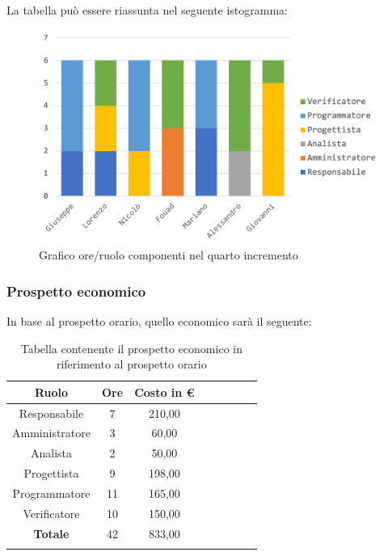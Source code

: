 		La tabella può essere riassunta nel seguente istogramma:
		\begin{figure}[H]
			\centering
			\includegraphics[width=0.8\linewidth]{./images/preventivo/incremento4-1.png}
			\caption{Grafico ore/ruolo componenti nel quarto  incremento}
			\label{fig:grafico suddivione ruoli incremento IV}
		\end{figure}
		
		\subsubsection{Prospetto economico}
		In base al prospetto orario, quello economico sarà il seguente: 
		
		\begin{longtable}{|c|c|c|c|c|c|c|c|}
			\hline
			\rowcolor{lighter-grayer}
			\textbf{Ruolo} & \textbf{Ore} & \textbf{Costo in € } \\
			\hline
			\endfirsthead
			
			\hline
			Responsabile 	    & 7 & 210,00\\
			\hline 
			\hline
			Amministratore	   & 3 & 60,00\\
			\hline
			\hline
			Analista 				& 2 & 50,00\\
			\hline
			\hline
			Progettista 		   & 9 & 198,00\\
			\hline
			\hline
			Programmatore 	  & 11 & 165,00\\
			\hline
			\hline
			Verificatore 		   & 10 & 150,00\\
			\hline
			\textbf{Totale} 	 & 42 & 833,00\\
			\hline
			\caption{Tabella contenente il prospetto economico in riferimento al prospetto orario}
		\end{longtable}
		\pagebreak
		
